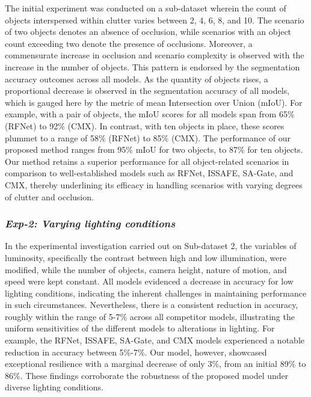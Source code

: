 \documentclass[lettersize,journal]{IEEEtran}
\begin{document}
The initial experiment was conducted on a sub-dataset wherein the count of objects interspersed within clutter varies between 2, 4, 6, 8, and 10. The scenario of two objects denotes an absence of occlusion, while scenarios with an object count exceeding two denote the presence of occlusions. Moreover, a commensurate increase in occlusion and scenario complexity is observed with the increase in the number of objects. This pattern is endorsed by the segmentation accuracy outcomes across all models. As the quantity of objects rises, a proportional decrease is observed in the segmentation accuracy of all models, which is gauged here by the metric of mean Intersection over Union (mIoU). For example, with a pair of objects, the mIoU scores for all models span from 65\% (RFNet) to 92\% (CMX). In contrast, with ten objects in place, these scores plummet to a range of 58\% (RFNet) to 85\% (CMX). The performance of our proposed method ranges from  95\% mIoU for two objects, to 87\% for ten objects. Our method retains a superior performance for all object-related scenarios in comparison to well-established models such as RFNet, ISSAFE, SA-Gate, and CMX, thereby underlining its efficacy in handling scenarios with varying degrees of clutter and occlusion. 




\subsubsection{\textbf{\textit{Exp-2: Varying lighting conditions}}} 
\label{subsubsection : light conditions results}

In the experimental investigation carried out on Sub-dataset 2, the variables of luminosity, specifically the contrast between high and low illumination, were modified, while the number of objects, camera height, nature of motion, and speed were kept constant. All models evidenced a decrease in accuracy for low lighting conditions, indicating the inherent challenges in maintaining performance in such circumstances. Nevertheless, there is a consistent reduction in accuracy, roughly within the range of 5-7\% across all competitor models, illustrating the uniform sensitivities of the different models to alterations in lighting. For example, the RFNet, ISSAFE, SA-Gate, and CMX models experienced a notable reduction in accuracy between 5\%-7\%. Our model, however, showcased exceptional resilience with a marginal decrease of only 3\%, from an initial 89\% to 86\%. These findings corroborate the robustness of the proposed model under diverse lighting conditions.
\end{document}
